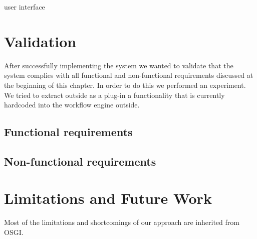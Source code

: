 user interface

\section{Validation}

After successfully implementing the system we wanted to validate that the system complies with all functional and non-functional requirements discussed at the beginning of this chapter. In order to do this we performed an experiment. We tried to extract outside as a plug-in a functionality that is currently hardcoded into the workflow engine outside.

\subsection{Functional requirements}

\subsection{Non-functional requirements}



\section{Limitations and Future Work}

Most of the limitations and shortcomings of our approach are inherited from OSGI. 

